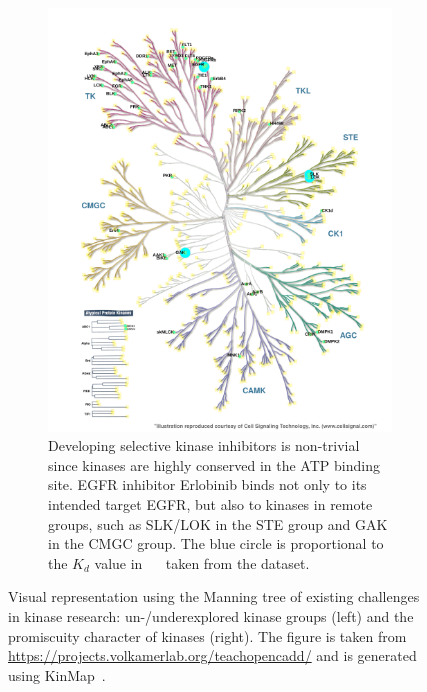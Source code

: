 \documentclass[9pt,training]{livecoms}
\begin{document}
\begin{figure}
\begin{subfigure}[b]{0.2\textwidth}
         \label{fig:structure_per_kinase}
     \end{subfigure}
     \hfill
     \begin{subfigure}[b]{0.2\textwidth}
         \centering
         \includegraphics[width=\textwidth]{kinmap_erlotinib_karaman.png}
         \caption{Developing selective kinase inhibitors is non-trivial since kinases are highly conserved in the ATP binding site. EGFR inhibitor Erlobinib binds not only to its intended target EGFR, but also to kinases in remote groups, such as SLK/LOK in the STE group and GAK in the CMGC group. The blue circle is proportional to the $K_d$ value in \SI{}{\nano\Molar} taken from the \citet{Karaman_2008_NatBiotechnol} dataset.}
         \label{fig:off_target}
     \end{subfigure}
        \caption{Visual representation using the Manning tree of existing challenges in kinase research: un-/underexplored kinase groups (left) and the promiscuity character of kinases (right). The figure is taken from \href{https://projects.volkamerlab.org/teachopencadd/}{https://projects.volkamerlab.org/teachopencadd/} and is generated using KinMap~\cite{Eid_2017_BMCBioinformatics}.}
        \label{fig:kinmap}
\end{figure}
\end{document}
